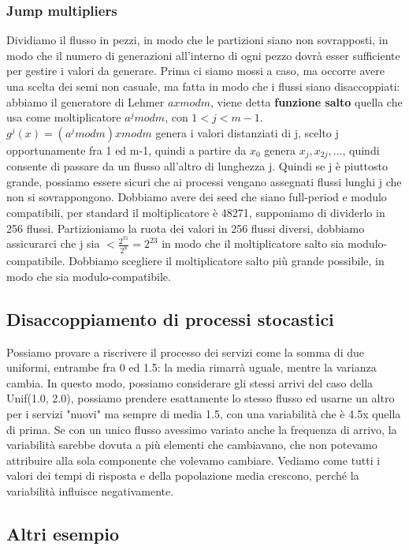 \documentclass{article}
\begin{document}
\subsubsection{Jump multipliers}
Dividiamo il flusso in pezzi, in modo che le partizioni siano non sovrapposti, in modo che il numero di generazioni all'interno di ogni pezzo dovrà esser sufficiente per gestire i valori da generare. Prima ci siamo mossi a caso, ma occorre avere una scelta dei semi non casuale, ma fatta in modo che i flussi siano disaccoppiati: abbiamo il generatore di Lehmer $ax mod m$, viene detta \textbf{funzione salto} quella che usa come moltiplicatore $a^{j}mod m$, con $1 < j < m - 1$. $g^j(x) = (a^j mod m)x mod m$ genera i valori distanziati di j, scelto j opportunamente fra 1 ed m-1, quindi a partire da $x_0$ genera $x_j, x_{2j},...$, quindi consente di passare da un flusso all'altro di lunghezza j. Quindi se j è piuttosto grande, possiamo essere sicuri che ai processi vengano assegnati flussi lunghi j che non si sovrappongono. Dobbiamo avere dei seed che siano full-period e modulo compatibili, per standard il moltiplicatore è 48271, supponiamo di dividerlo in 256 flussi. Partizioniamo la ruota dei valori in 256 flussi diversi, dobbiamo assicurarci che j sia $< \frac{2^{31}}{2^8} = 2^{23}$ in modo che il moltiplicatore salto sia modulo-compatibile. Dobbiamo scegliere il moltiplicatore salto più grande possibile, in modo che sia modulo-compatibile.
\subsection{Disaccoppiamento di processi stocastici}
Possiamo provare a riscrivere il processo dei servizi come la somma di due uniformi, entrambe fra 0 ed 1.5: la media rimarrà uguale, mentre la varianza cambia. In questo modo, possiamo considerare gli stessi arrivi del caso della Unif(1.0, 2.0), possiamo prendere esattamente lo stesso flusso ed usarne un altro per i servizi "nuovi" ma sempre di media 1.5, con una variabilità che è 4.5x quella di prima. Se con un unico flusso avessimo variato anche la frequenza di arrivo, la variabilità sarebbe dovuta a più elementi che cambiavano, che non potevamo attribuire alla sola componente che volevamo cambiare. Vediamo come tutti i valori dei tempi di risposta e della popolazione media crescono, perché la variabilità influisce negativamente.
\subsection{Altri esempio}
\end{document}
